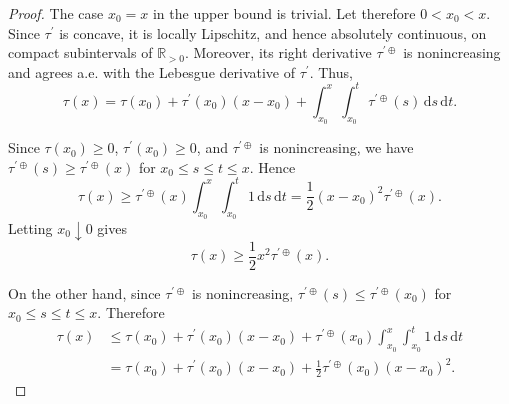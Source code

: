 \documentclass{article}
\newcommand{\R}{\mathbb{R}}
\newcommand{\Rpp}{\R_{>0}}
\newcommand{\pr}{^\prime}
\newcommand{\dl}{\mathrm{d}} %
\newcommand{\tran}{\tau}
\newcommand{\dtran}{\tau\pr}
\newcommand{\ddrtran}{\tau^{\prime\oplus}}
\begin{document}
%
\begin{proof}
    The case $x_0=x$ in the upper bound is trivial. Let therefore
    $0<x_0<x$. Since $\dtran$ is concave, it is locally Lipschitz, and hence
    absolutely continuous, on compact subintervals of $\Rpp$. Moreover, its
    right derivative $\ddrtran$ is nonincreasing and agrees a.e. with the
    Lebesgue derivative of $\dtran$. Thus,
    \begin{equation}
        \tran(x)
        =
        \tran(x_0)
        +
        \dtran(x_0)(x-x_0)
        +
        \int_{x_0}^x \int_{x_0}^t \ddrtran(s)\,\dl s\,\dl t .
    \end{equation}
    
    Since $\tran(x_0)\geq0$, $\dtran(x_0)\geq0$, and $\ddrtran$ is
    nonincreasing, we have $\ddrtran(s)\geq\ddrtran(x)$ for
    $x_0\leq s\leq t\leq x$. Hence
    \begin{equation}
        \tran(x)
        \geq
        \ddrtran(x)
        \int_{x_0}^x\int_{x_0}^t 1\,\dl s\,\dl t
        =
        \frac12 (x-x_0)^2 \ddrtran(x).
    \end{equation}
    Letting $x_0\downarrow0$ gives
    \begin{equation}
        \tran(x)\geq \frac12 x^2\ddrtran(x).
    \end{equation}
    
    On the other hand, since $\ddrtran$ is nonincreasing,
    $\ddrtran(s)\leq\ddrtran(x_0)$ for $x_0\leq s\leq t\leq x$. Therefore
    \begin{align}
        \tran(x)
        &\leq
        \tran(x_0)
        +
        \dtran(x_0)(x-x_0)
        +
        \ddrtran(x_0)
        \int_{x_0}^x\int_{x_0}^t 1\,\dl s\,\dl t
        \\
        &=
        \tran(x_0)
        +
        \dtran(x_0)(x-x_0)
        +
        \frac12 \ddrtran(x_0)(x-x_0)^2 .
    \end{align}
\end{proof}
%
%
%
\end{document}
